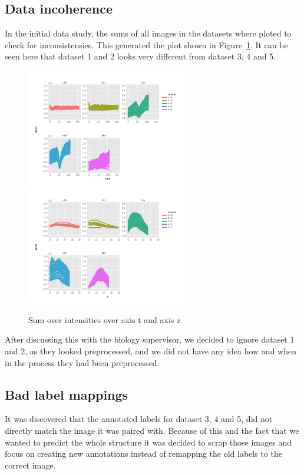 \subsection{Data incoherence} %
\label{sub:data_incoherence}
In the initial data study, the sums of all images in the datasets where ploted to check for inconsistensies.
This generated the plot shown in Figure~\ref{fig:intensity_densities}.
It can be seen here that dataset 1 and 2 looks very different from dataset 3, 4 and 5.
\begin{figure}[H]
    \centering
    \includegraphics[width = 2.8in]{img/sum_density_t.png}
    \includegraphics[width = 2.8in]{img/sum_density_z.png}
    \caption{Sum over intensities over axis t and axis z}
    \label{fig:intensity_densities}
\end{figure}

After discussing this with the biology supervisor, we decided to ignore dataset 1 and 2, as they looked preprocessed, and we did not have any idea how and when in the process they had been preprocessed.

\subsection{Bad label mappings} %
\label{sub:bad_label_mapping}
It was discovered that the annotated labels for dataset 3, 4 and 5, did not directly match the image it was paired with.
Because of this and the fact that we wanted to predict the whole structure it was decided to scrap those images and focus on creating new annotations instead of remapping the old labels to the correct image.

